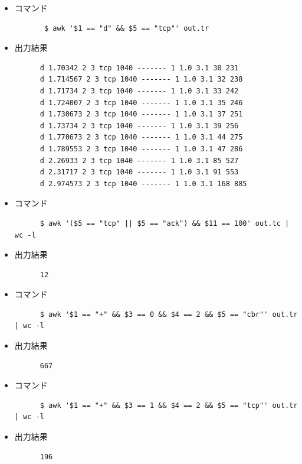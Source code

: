 \documentclass[paper=a4, fontsize=10pt]{jlreq}
\begin{document}
\begin{itemize}
  \item コマンド
    \begin{lstlisting}
       $ awk '$1 == "d" && $5 == "tcp"' out.tr
     \end{lstlisting}

  \item 出力結果 
    \begin{lstlisting}
      d 1.70342 2 3 tcp 1040 ------- 1 1.0 3.1 30 231
      d 1.714567 2 3 tcp 1040 ------- 1 1.0 3.1 32 238
      d 1.71734 2 3 tcp 1040 ------- 1 1.0 3.1 33 242
      d 1.724007 2 3 tcp 1040 ------- 1 1.0 3.1 35 246
      d 1.730673 2 3 tcp 1040 ------- 1 1.0 3.1 37 251
      d 1.73734 2 3 tcp 1040 ------- 1 1.0 3.1 39 256
      d 1.770673 2 3 tcp 1040 ------- 1 1.0 3.1 44 275
      d 1.789553 2 3 tcp 1040 ------- 1 1.0 3.1 47 286
      d 2.26933 2 3 tcp 1040 ------- 1 1.0 3.1 85 527
      d 2.31717 2 3 tcp 1040 ------- 1 1.0 3.1 91 553
      d 2.974573 2 3 tcp 1040 ------- 1 1.0 3.1 168 885
    \end{lstlisting}

  \item コマンド
    \begin{lstlisting}
      $ awk '($5 == "tcp" || $5 == "ack") && $11 == 100' out.tc | wc -l
    \end{lstlisting}

  \item 出力結果 
    \begin{lstlisting}
      12
    \end{lstlisting}

  \item コマンド
    \begin{lstlisting}
      $ awk '$1 == "+" && $3 == 0 && $4 == 2 && $5 == "cbr"' out.tr | wc -l
    \end{lstlisting}

  \item 出力結果 
    \begin{lstlisting}
      667
    \end{lstlisting}

  \item コマンド
    \begin{lstlisting}
      $ awk '$1 == "+" && $3 == 1 && $4 == 2 && $5 == "tcp"' out.tr | wc -l
    \end{lstlisting}

  \item 出力結果 
    \begin{lstlisting}
      196
    \end{lstlisting}


\end{itemize}
\end{document}
